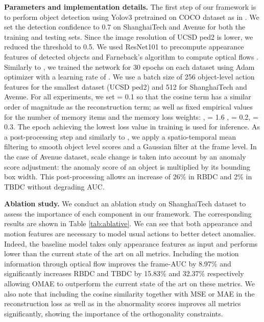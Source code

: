 \documentclass{article}
\begin{document}
\noindent\textbf{Parameters and implementation details.} \label{subsec:implementation} The first step of our framework is to perform object detection using Yolov3 \cite{yolov3} pretrained on COCO dataset as in \cite{ssmt,baf,dummyae}. We set the detection confidence to 0.7 on ShanghaiTech and Avenue for both the training and testing sets. Since the image resolution of UCSD ped2 is lower, we reduced the threshold to 0.5. We used ResNet101 to precompute appearance features of detected objects and Farneback's algorithm to compute optical flows \cite{farneback2003two}. Similarly to \cite{ssmt},  we trained the network for 30 epochs on each dataset using Adam optimizer with a learning rate of . We use a batch size of 256 object-level action features for the smallest dataset (UCSD ped2) and 512 for ShanghaiTech and Avenue. 
For all experiments, we set  = 0.1 so that the cosine term has a similar order of magnitude as the  reconstruction term;
as well as fixed empirical values for the number of memory items and the memory loss weights: ,  = 1.6 ,  = 0.2,  = 0.3. 
The epoch achieving the lowest loss value in training is used for inference. As a post-processing step and similarly to \cite{baf}, we apply a spatio-temporal mean filtering to smooth object level scores and a Gaussian filter at the frame level. In the case of Avenue dataset,
scale change is taken into account by an anomaly score adjustment: the anomaly score of an object is multiplied by its bounding box width. 
This post-processing allows an increase of 26\% in RBDC and 2\% in TBDC
without degrading AUC. 


\vspace{1mm}

\noindent\textbf{Ablation study.} We conduct an ablation study on ShanghaiTech dataset to assess the importance of each component in our framework. The corresponding results are shown in Table \ref{tab:ablative}. We can see that both appearance and motion features are necessary to model usual actions to better detect anomalies. Indeed, the baseline model takes only appearance features as input and performs lower than the current state of the art on all metrics. 
Including the motion information through optical flow improves the frame-AUC by 8.97\% and significantly increases RBDC and TBDC by 15.83\% and 32.37\% respectively allowing OMAE to outperform the current state of the art on these metrics. 
We also note that including the cosine similarity together with MSE or MAE in the reconstruction loss as well as in the abnormality scores improves all metrics significantly, showing the importance of the orthogonality constraints. 
\end{document}
